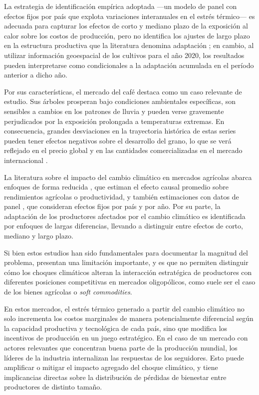 La estrategia de identificación empírica adoptada —un modelo de panel con efectos fijos por país que explota variaciones interanuales en el estrés térmico— es adecuada para capturar los efectos de corto y mediano plazo de la exposición al calor sobre los costos de producción, pero no identifica los ajustes de largo plazo en la estructura productiva que la literatura denomina adaptación \citep{burke2016adaptation, dell2012temperature}; en cambio, al utilizar información geoespacial de los cultivos para el año 2020, los resultados pueden interpretarse como condicionales a la adaptación acumulada en el período anterior a dicho año.

Por sus características, el mercado del café destaca como un caso relevante de estudio. Sus árboles prosperan bajo condiciones ambientales específicas, son sensibles a cambios en los patrones de lluvia y pueden verse gravemente perjudicados por la exposición prolongada a temperaturas extremas. En consecuencia, grandes desviaciones en la trayectoria histórica de estas series pueden tener efectos negativos sobre el desarrollo del grano, lo que se verá reflejado en el precio global y en las cantidades comercializadas en el mercado internacional \citep{ICO2009ClimateCoffee, covindassamy2017sugar}.

La literatura sobre el impacto del cambio climático en mercados agrícolas abarca enfoques de forma reducida \citep{DeschenesGreenstone2007}, que estiman el efecto causal promedio sobre rendimientos agrícolas o productividad, y también estimaciones con datos de panel \citep{bilal2024macroeconomic}, que consideran efectos fijos por país y por año. Por su parte, la adaptación de los productores afectados por el cambio climático es identificada por enfoques de largas diferencias, llevando a distinguir entre efectos de corto, mediano y largo plazo.

Si bien estos estudios han sido fundamentales para documentar la magnitud del problema, presentan una limitación importante, y es que no permiten distinguir cómo los choques climáticos alteran la interacción estratégica de productores con diferentes posiciones competitivas en mercados oligopólicos, como suele ser el caso de los bienes agrícolas o \textit{soft commodities}.

En estos mercados, el estrés térmico generado a partir del cambio climático no solo incrementa los costos marginales de manera potencialmente diferencial según la capacidad productiva y tecnológica de cada país, sino que modifica los incentivos de producción en un juego estratégico. En el caso de un mercado con actores relevantes que concentran buena parte de la producción mundial, los líderes de la industria internalizan las respuestas de los seguidores. Esto puede amplificar o mitigar el impacto agregado del choque climático, y tiene implicancias directas sobre la distribución de pérdidas de bienestar entre productores de distinto tamaño.

